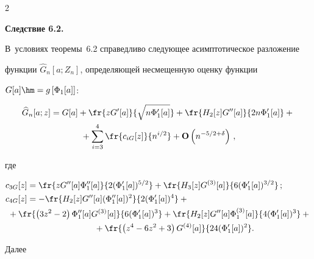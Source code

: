 \begin{multicols}{2}
  \smallskip





\noindent


\textbf{Следствие 6.2.}\


 В~условиях теоремы~6.2 справедливо следующее асимптотическое разложение


  функции $\widehat{G}_n[a;Z_n]$, определяющей несмещенную оценку функции


  $G[a]\hm=g\left[\Phi_1[a]\right]$:


  \begin{multline*}


 \widehat{G}_n[a;z]=G[a]+\fr{z G'[a]}{\sqrt{n\Phi_1'[a]}}+


 \fr{H_2[z] G''[a]}{2n \Phi_1'[a]} +{}\\


 {}+


 \sum\limits_{i=3}^4 \fr{c_{iG}[z]}{n^{i/2}}+\Op\left(n^{-5/2+\delta}\right)\,,




 \end{multline*}


 где


 \begin{align*}


 c_{3G}[z]&=  \fr{z G''[a] \Phi_1''[a]}{2 (\Phi_1'[a])^{5/2}}+


 \fr{H_3[z] G^{(3)}[a]}{6 (\Phi_1'[a])^{3/2}}\,;


\\


 c_{4G}[z]&=  -\fr{H_2[z] G''[a] (\Phi_1''[a])^2}{2 (\Phi_1'[a])^4}+{}\\


& \hspace*{-8mm}{}+


 \fr{\left(3z^2-2\right) \Phi_1''[a] G^{(3)}[a]}{6 (\Phi_1'[a])^3}


 +\fr{H_2[z] G''[a] \Phi_1^{(3)}[a]}{4 (\Phi_1'[a])^3}+{}\\


&\hspace*{28mm} {}+


 \fr{\left(z^4-6 z^2+3\right) G^{(4)}[a]}{24 (\Phi_1'[a])^2}.


 \end{align*}








  Далее



\end{multicols}
